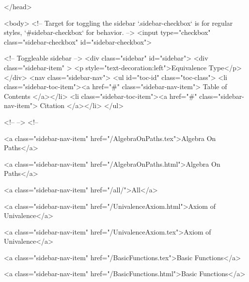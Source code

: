   
</head>




  <body>
    <!-- Target for toggling the sidebar `.sidebar-checkbox` is for regular
     styles, `#sidebar-checkbox` for behavior. -->
<input type="checkbox" class="sidebar-checkbox" id="sidebar-checkbox">

<!-- Toggleable sidebar -->
<div class="sidebar" id="sidebar">
  <div class="sidebar-item" >
    <p style="text-decoration:left">Equivalence Type</p>
  </div>
  <nav class="sidebar-nav">
    <ul id="toc-id" class="toc-class">
  <li class="sidebar-toc-item"><a href="#" class="sidebar-nav-item"> Table of Contents </a></li>
  <li class="sidebar-toc-item"><a href="#" class="sidebar-nav-item"> Citation </a></li>
</ul>


    <!--  -->
    <!-- 
      
    
      
    
      
    
      
        
      
    
      
        
          <a class="sidebar-nav-item" href="/AlgebraOnPaths.tex">Algebra On Paths</a>
        
      
    
      
        
          <a class="sidebar-nav-item" href="/AlgebraOnPaths.html">Algebra On Paths</a>
        
      
    
      
        
          <a class="sidebar-nav-item" href="/all/">All</a>
        
      
    
      
        
          <a class="sidebar-nav-item" href="/UnivalenceAxiom.html">Axiom of Univalence</a>
        
      
    
      
        
          <a class="sidebar-nav-item" href="/UnivalenceAxiom.tex">Axiom of Univalence</a>
        
      
    
      
        
          <a class="sidebar-nav-item" href="/BasicFunctions.tex">Basic Functions</a>
        
      
    
      
        
          <a class="sidebar-nav-item" href="/BasicFunctions.html">Basic Functions</a>
        
